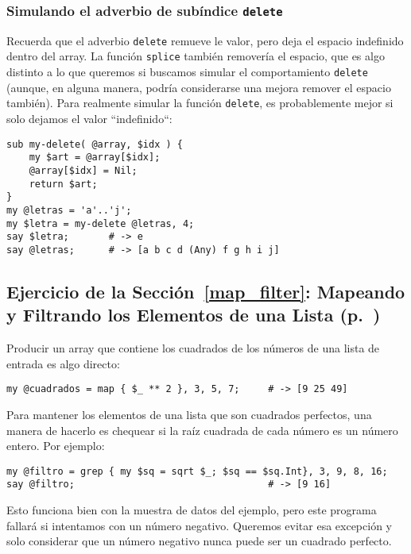 \subsubsection{Simulando el adverbio de subíndice {\tt delete}}

Recuerda que el adverbio {\tt delete} remueve le valor, pero deja
el espacio indefinido dentro del array. La función {\tt splice}
también removería el espacio, que es algo distinto a lo que queremos
si buscamos simular el comportamiento {\tt delete} (aunque, en 
alguna manera, podría considerarse una mejora remover el espacio
también). Para realmente simular la función {\tt delete}, es
probablemente mejor si solo dejamos el valor ``indefinido``:

\begin{verbatim}
sub my-delete( @array, $idx ) {
    my $art = @array[$idx];
    @array[$idx] = Nil;
    return $art;
}
my @letras = 'a'..'j';
my $letra = my-delete @letras, 4;
say $letra;       # -> e
say @letras;      # -> [a b c d (Any) f g h i j]
\end{verbatim}

\subsection{Ejercicio de la Sección~\ref{map_filter}: Mapeando y Filtrando los Elementos de una Lista (p.~\pageref{exercise_squares})}
\label{sol_exercise_squares}

Producir un array que contiene los cuadrados de los números de
una lista de entrada es algo directo:

\begin{verbatim}
my @cuadrados = map { $_ ** 2 }, 3, 5, 7;     # -> [9 25 49]
\end{verbatim}
%

Para mantener los elementos de una lista que son cuadrados perfectos,
una manera de hacerlo es chequear si la raíz cuadrada de cada 
número es un número entero. Por ejemplo:

\begin{verbatim}
my @filtro = grep { my $sq = sqrt $_; $sq == $sq.Int}, 3, 9, 8, 16;
say @filtro;                                  # -> [9 16]
\end{verbatim}
%

Esto funciona bien con la muestra de datos del ejemplo, pero
este programa fallará si intentamos con un número negativo.
Queremos evitar esa excepción y solo considerar que un número
negativo nunca puede ser un cuadrado perfecto.

